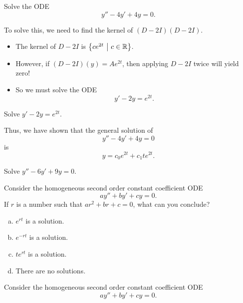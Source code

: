
\begin{applicationActivities}

\begin{activity}{10}
Solve the ODE \[ y''-4y'+4y=0.\]
\end{activity}

\begin{observation}
To solve this, we need to find the kernel of \( (D-2I)(D-2I) \).
\begin{itemize}
\item The kernel of \(D-2I\) is \(\left\{ ce^{2t}\ \middle|\ c \in \mathbb{R} \right\}\).
\item However, if \( (D-2I)(y) = Ae^{2t} \), then applying \(D-2I\) twice will yield zero!
\item So we must solve the ODE \[y'-2y=e^{2t}.\]
\end{itemize}
\end{observation}

\begin{activity}{15}
Solve \(y'-2y=e^{2t}\).
\end{activity}


\begin{observation}
Thus, we have shown that the general solution of \[y''-4y'+4y=0\] is \[y=c_0e^{2t}+c_1te^{2t}.\]
\end{observation}

\begin{activity}{15}
Solve \(y''-6y'+9y=0\).
\end{activity}

\begin{activity}{10}
Consider the homogeneous second order constant coefficient ODE \[ay''+by'+cy=0.\]
If \(r\) is a number such that \(ar^2+br+c=0\), what can you conclude?
\begin{enumerate}[(a)]
\item \(e^{rt}\) is a solution.
\item \(e^{-rt}\) is a solution.
\item \(te^{rt}\) is a solution.
\item There are no solutions.
\end{enumerate}
\end{activity}

\begin{activity}{5}
Consider the homogeneous second order constant coefficient ODE \[ay''+by'+cy=0.\]


\end{activity}
\end{applicationActivities}
